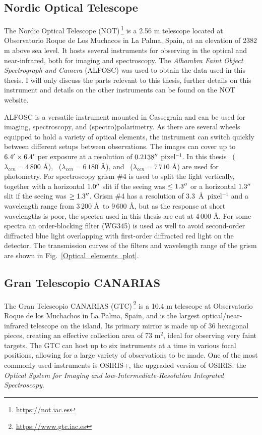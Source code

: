 \documentclass[a4paper,oneside,12pt, class=Latex/Classes/PhDthesisPSnPDF, crop=false]{standalone}
\begin{document}
\subsection{Nordic Optical Telescope}
\label{NOT}
The Nordic Optical Telescope (NOT)\,\footnote{\url{https://not.iac.es}} is a 2.56 m telescope located at Observatorio Roque de Los Muchacos in La Palma, Spain, at an elevation of 2382 m above sea level. It hosts several instruments for observing in the optical and near-infrared, both for imaging and spectroscopy. The \textit{Alhambra Faint Object Spectrograph and Camera} (ALFOSC) was used to obtain the data used in this thesis. I will only discuss the parts relevant to this thesis, further details on this instrument and details on the other instruments can be found on the NOT website.

ALFOSC is a versatile instrument mounted in Cassegrain and can be used for imaging, spectroscopy, and (spectro)polarimetry. As there are several wheels equipped to hold a variety of optical elements, the instrument can switch quickly between different setups between observations. The images can cover up to $6.4^{\prime}\times6.4^{\prime}$ per exposure at a resolution of $0.2138^{\prime\prime}$ pixel$^{-1}$. In this thesis \ztfg~($\lambda_{cen} = 4\,800$ \AA), \ztfr~($\lambda_{cen} = 6\,180$ \AA), and \ztfi~($\lambda_{cen} = 7\,710$ \AA) are used for photometry. For spectroscopy grism \#4 is used to split the light vertically, together with a horizontal $1.0^{\prime\prime}$ slit if the seeing was $\leq1.3^{\prime\prime}$ or a horizontal $1.3^{\prime\prime}$ slit if the seeing was $\geq1.3^{\prime\prime}$. Grism \#4 has a resolution of 3.3~\AA~pixel$^{-1}$ and a wavelength range from 3\,200 \AA\ to 9\,600 \AA, but as the response at short wavelengths is poor, the spectra used in this thesis are cut at 4\,000 \AA. For some spectra an order-blocking filter (WG345) is used as well to avoid second-order diffracted blue light overlapping with first-order diffracted red light on the detector. The transmission curves of the filters and wavelength range of the grism are shown in Fig.~\ref{Optical_elements_plot}.


\subsection{Gran Telescopio CANARIAS}
\label{GTC}
The Gran Telescopio CANARIAS (GTC)\,\footnote{\url{https://www.gtc.iac.es}} is a 10.4 m telescope at Observatorio Roque de los Muchachos in La Palma, Spain, and is the largest optical/near-infrared telescope on the island. Its primary mirror is made up of 36 hexagonal pieces, creating an effective collection area of 73 m$^2$, ideal for observing very faint targets. The GTC can host up to six instruments at a time in various focal positions, allowing for a large variety of observations to be made. One of the most commonly used instruments is OSIRIS+, the upgraded version of OSIRIS: the \textit{Optical System for Imaging and low-Intermediate-Resolution Integrated Spectroscopy}.
\end{document}
